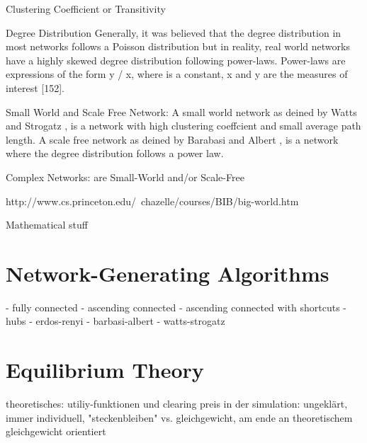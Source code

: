 \documentclass[../Bachelorarbeit.tex]{subfiles}
\begin{document}
Clustering Coefficient or Transitivity \citep{WattsStrogatz_DynamicsSmallWorld}

Degree Distribution \citep{BarabasiAlbert_EmergenceScaling} Generally, it was believed that the degree distribution in most networks follows a
Poisson distribution but in reality, real world networks have a highly skewed degree distribution following power-laws. Power-laws are expressions of the form y / x, where is a constant, x and y are the measures of interest [152].

Small World and Scale Free Network: A small world network as deined by Watts and Strogatz \cite{WattsStrogatz_DynamicsSmallWorld}, is a network with high clustering coeffcient and small average path length. A scale free network as deined by Barabasi and Albert \citep{BarabasiAlbert_EmergenceScaling}, is a network where the degree distribution follows a power law.

Complex Networks: are Small-World and/or Scale-Free \citep{BarratWeigt_PropertiesSmallWorld} \citep{AmaralScalaStanley_ClassesSmallWorld}

\citep {Kleinfeld_BigWorld}
http://www.cs.princeton.edu/~chazelle/courses/BIB/big-world.htm

Mathematical stuff 
\citep{Newman_Eigenvectors}
\citep{AielloChungLu_RandomEvolution}
\citep{EbelMielschBornholdt_TopologyEmail}
\citep{GaertlerPatrignani_AutonomousSystem}

\section{Network-Generating Algorithms}
- fully connected
- ascending connected
- ascending connected with shortcuts
- hubs
- erdos-renyi
- barbasi-albert
- watts-strogatz

\section{Equilibrium Theory}	
		theoretisches: utiliy-funktionen und clearing preis
		in der simulation: ungeklärt, immer individuell, "steckenbleiben" vs. gleichgewicht, am ende an theoretischem gleichgewicht orientiert
\end{document}
